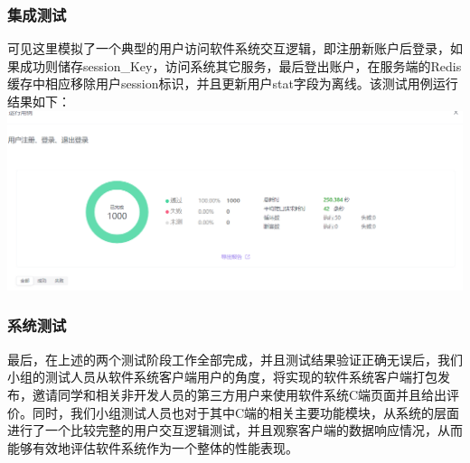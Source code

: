 \begin{frame}
    \frametitle{集成测试}
    可见这里模拟了一个典型的用户访问软件系统交互逻辑，即注册新账户后登录，如果成功则储存session\_Key，访问系统其它服务，最后登出账户，在服务端的Redis缓存中相应移除用户session标识，并且更新用户stat字段为离线。该测试用例运行结果如下：
    \includegraphics[width=\textwidth]{contents/figure/user_register_4.png}
\end{frame}

\begin{frame}
    \frametitle{系统测试}
    最后，在上述的两个测试阶段工作全部完成，并且测试结果验证正确无误后，我们小组的测试人员从软件系统客户端用户的角度，将实现的软件系统客户端打包发布，邀请同学和相关非开发人员的第三方用户来使用软件系统C端页面并且给出评价。同时，我们小组测试人员也对于其中C端的相关主要功能模块，从系统的层面进行了一个比较完整的用户交互逻辑测试，并且观察客户端的数据响应情况，从而能够有效地评估软件系统作为一个整体的性能表现。
\end{frame}